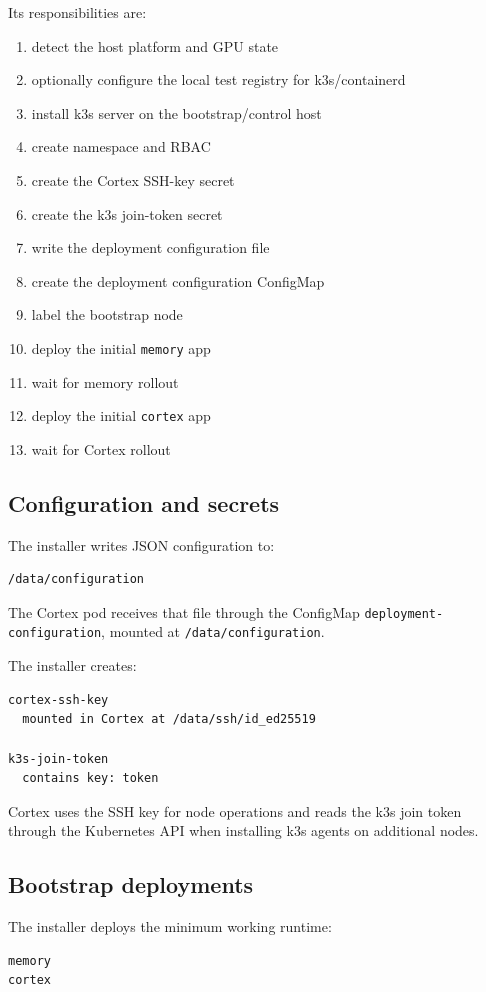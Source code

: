\documentclass[11pt,a4paper]{article}
\begin{document}
Its responsibilities are:
\begin{enumerate}[leftmargin=1.3em]
  \item detect the host platform and GPU state
  \item optionally configure the local test registry for k3s/containerd
  \item install k3s server on the bootstrap/control host
  \item create namespace and RBAC
  \item create the Cortex SSH-key secret
  \item create the k3s join-token secret
  \item write the deployment configuration file
  \item create the deployment configuration ConfigMap
  \item label the bootstrap node
  \item deploy the initial \texttt{memory} app
  \item wait for memory rollout
  \item deploy the initial \texttt{cortex} app
  \item wait for Cortex rollout
\end{enumerate}

\subsection{Configuration and secrets}
The installer writes JSON configuration to:
\begin{lstlisting}
/data/configuration
\end{lstlisting}

The Cortex pod receives that file through the ConfigMap \texttt{deployment-configuration}, mounted at \texttt{/data/configuration}.

The installer creates:
\begin{lstlisting}
cortex-ssh-key
  mounted in Cortex at /data/ssh/id_ed25519

k3s-join-token
  contains key: token
\end{lstlisting}

Cortex uses the SSH key for node operations and reads the k3s join token through the Kubernetes API when installing k3s agents on additional nodes.

\subsection{Bootstrap deployments}
The installer deploys the minimum working runtime:
\begin{lstlisting}
memory
cortex
\end{lstlisting}
\end{document}
